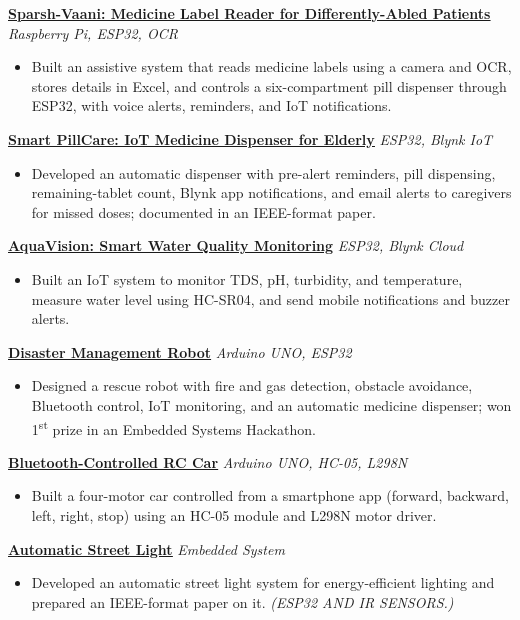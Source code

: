 \documentclass[letterpaper,11pt]{article}
\newcommand{\resumeProject}[3]{
  \vspace{-1pt}\item \href{#1}{\textbf{\underline{#2}}} \hfill \small\textit{#3}\vspace{-2pt}
}
\newcommand{\resumeItemListStart}{\begin{itemize}[leftmargin=0.18in,noitemsep,topsep=2pt]}
\newcommand{\resumeItemListEnd}{\end{itemize}\vspace{-4pt}}
\begin{document}
\resumeProject{https://github.com/mathapatiappayya88-dm/Sparsh-Vaani-Multi-Sensory-Medicine-Label-Reader-for-Differently-Abled-Patients}
{Sparsh-Vaani: Medicine Label Reader for Differently-Abled Patients}{Raspberry Pi, ESP32, OCR}
\resumeItemListStart
\item \small Built an assistive system that reads medicine labels using a camera and OCR, stores details in Excel, and controls a six-compartment pill dispenser through ESP32, with voice alerts, reminders, and IoT notifications.
\resumeItemListEnd

\resumeProject{https://github.com/mathapatiappayya88-dm/SMART-PILLCARE-IoT-Based-Automatic-Medicine-Dispenser-for-Elderly-People}
{Smart PillCare: IoT Medicine Dispenser for Elderly}{ESP32, Blynk IoT}
\resumeItemListStart
\item \small Developed an automatic dispenser with pre-alert reminders, pill dispensing, remaining-tablet count, Blynk app notifications, and email alerts to caregivers for missed doses; documented in an IEEE-format paper.
\resumeItemListEnd

\resumeProject{https://github.com/mathapatiappayya88-dm/AquaVision-Smart-Water-Quality-Monitoring-System}
{AquaVision: Smart Water Quality Monitoring}{ESP32, Blynk Cloud}
\resumeItemListStart
\item \small Built an IoT system to monitor TDS, pH, turbidity, and temperature, measure water level using HC-SR04, and send mobile notifications and buzzer alerts.
\resumeItemListEnd

\resumeProject{https://github.com/mathapatiappayya88-dm/DISASTER-MANAGEMENT-ROBOT-}
{Disaster Management Robot}{Arduino UNO, ESP32}
\resumeItemListStart
\item \small Designed a rescue robot with fire and gas detection, obstacle avoidance, Bluetooth control, IoT monitoring, and an automatic medicine dispenser; won 1\textsuperscript{st} prize in an Embedded Systems Hackathon.
\resumeItemListEnd

\resumeProject{https://github.com/mathapatiappayya88-dm/BLUETOOTH-CONTROL-CAR}
{Bluetooth-Controlled RC Car}{Arduino UNO, HC-05, L298N}
\resumeItemListStart
\item \small Built a four-motor car controlled from a smartphone app (forward, backward, left, right, stop) using an HC-05 module and L298N motor driver.
\resumeItemListEnd

\resumeProject{https://github.com/mathapatiappayya88-dm}
{Automatic Street Light}{Embedded System}
\resumeItemListStart
\item \small Developed an automatic street light system for energy-efficient lighting and prepared an IEEE-format paper on it. \textit{(ESP32 AND IR SENSORS.)}
\resumeItemListEnd
\end{document}
